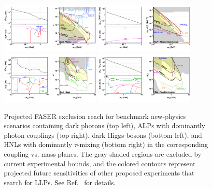 
\begin{figure}[t]
\centering
\includegraphics[trim={17.6cm 0 0 0}, clip, width=0.45\textwidth]{figures/faser/Reach_DarkPhoton.pdf}
\includegraphics[trim={17.6cm 0 0 0}, clip, width=0.45\textwidth]{figures/faser/Reach_ALP.pdf} \hspace{2cm}
\includegraphics[trim={17.6cm 0 0 0}, clip, width=0.45\textwidth]{figures/faser/Reach_DarkHiggs.pdf} 
\includegraphics[trim={17.6cm 0 0 0}, clip, width=0.45\textwidth]{figures/faser/Reach_HNL.pdf}
\caption{
Projected FASER exclusion reach for benchmark new-physics scenarios containing dark photons (top left),  ALPs with dominantly photon couplings (top right), dark Higgs bosons (bottom left), and HNLs with dominantly $\tau$-mixing (bottom right)  in the corresponding coupling vs. mass planes. The gray shaded regions are excluded by current experimental bounds, and the colored contours represent projected future sensitivities of other proposed experiments that search for LLPs. See Ref.~\cite{Ariga:2018uku} for details. 
}
\label{fig:Reach}
\end{figure}


